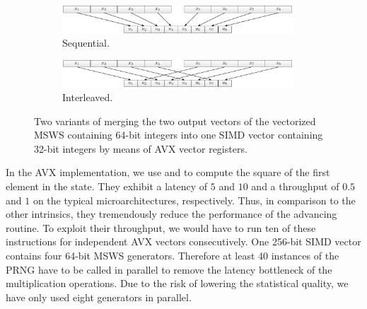 \documentclass{stdlocal}
\begin{document}
    \begin{figure}
      \center
      \begin{subfigure}[b]{\textwidth}
        \center
        \includegraphics[width=0.95\textwidth]{figures/msws_merge.pdf}
        \caption{Sequential.}
      \end{subfigure}

      \begin{subfigure}[b]{\textwidth}
        \center
        \includegraphics[width=0.95\textwidth]{figures/msws_merge2.pdf}
        \caption{Interleaved.}
      \end{subfigure}
      \caption[MSWS Vector Merge Scheme]{%
        Two variants of merging the two output vectors of the vectorized MSWS containing 64-bit integers into one SIMD vector containing 32-bit integers by means of AVX vector registers.
      }
      \label{fig:msws-vector-merge-scheme}
    \end{figure}

    In the AVX implementation, we use  and  to compute the square of the first element in the state.
    They exhibit a latency of $5$ and $10$ and a throughput of $0.5$ and $1$ on the typical microarchitectures, respectively.
    Thus, in comparison to the other intrinsics, they tremendously reduce the performance of the advancing routine.
    To exploit their throughput, we would have to run ten of these instructions for independent AVX vectors consecutively.
    One 256-bit SIMD vector contains four 64-bit MSWS generators.
    Therefore at least 40 instances of the PRNG have to be called in parallel to remove the latency bottleneck of the multiplication operations.
    Due to the risk of lowering the statistical quality, we have only used eight generators in parallel.
    \autocite{intel-intrinsics-guide,fog2019d}
\end{document}
